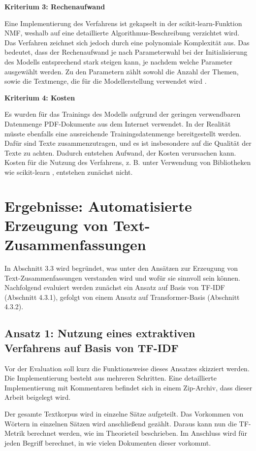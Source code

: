 {\bf Kriterium 3: Rechenaufwand}

Eine Implementierung des Verfahrens ist gekapselt in der scikit-learn-Funktion NMF, weshalb auf eine detaillierte Algorithmus-Beschreibung verzichtet wird. Das Verfahren zeichnet sich jedoch durch eine polynomiale Komplexität aus. Das bedeutet, dass der Rechenaufwand je nach Parameterwahl bei der Initialisierung des Modells entsprechend stark steigen kann, je nachdem welche Parameter ausgewählt werden. Zu den Parametern zählt sowohl die Anzahl der Themen, sowie die Textmenge, die für die Modellerstellung verwendet wird \cite{scikit1}.

{\bf Kriterium 4: Kosten}

Es wurden für das Trainings des Modells aufgrund der geringen verwendbaren Datenmenge PDF-Dokumente aus dem Internet verwendet. In der Realität müsste ebenfalls eine ausreichende Trainingsdatenmenge bereitgestellt werden. Dafür sind Texte zusammenzutragen, und es ist insbesondere auf die Qualität der Texte zu achten. Dadurch entstehen Aufwand, der Kosten verursachen kann. Kosten für die Nutzung des Verfahrens, z. B. unter Verwendung von Bibliotheken wie scikit-learn \cite{scikit-license}, entstehen zunächst nicht.

\section{Ergebnisse: Automatisierte Erzeugung von Text-Zusammenfassungen}

In Abschnitt 3.3 wird begründet, was unter den Ansätzen zur Erzeugung von Text-Zusammenfassungen verstanden wird und wofür sie sinnvoll sein können. Nachfolgend evaluiert werden zunächst ein Ansatz auf Basis von TF-IDF (Abschnitt 4.3.1), gefolgt von einem Ansatz auf Transformer-Basis (Abschnitt 4.3.2). 

\subsection{Ansatz 1: Nutzung eines extraktiven Verfahrens auf Basis von TF-IDF}

Vor der Evaluation soll kurz die Funktionsweise dieses Ansatzes skizziert werden. Die Implementierung besteht aus mehreren Schritten. Eine detaillierte Implementierung mit Kommentaren befindet sich in einem Zip-Archiv, dass dieser Arbeit beigelegt wird.

Der gesamte Textkorpus wird in einzelne Sätze aufgeteilt. Das Vorkommen von Wörtern in einzelnen Sätzen wird anschließend gezählt. Daraus kann nun die TF-Metrik berechnet werden, wie im Theorieteil beschrieben. Im Anschluss wird für jeden Begriff berechnet, in wie vielen Dokumenten dieser vorkommt.

